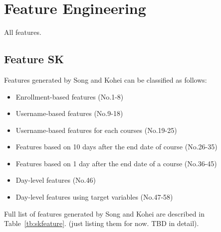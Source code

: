 \section{Feature Engineering}
All features.

\subsection{Feature SK}

Features generated by Song and Kohei can be classified as follows:

\begin{itemize}
  \setlength\itemsep{0em}
  \item Enrollment-based features (No.1-8)
  \item Username-based features (No.9-18)
  \item Username-based features for each courses (No.19-25) 
  \item Features based on 10 days after the end date of course (No.26-35)
  \item Features based on 1 day after the end date of a course (No.36-45)
  \item Day-level features (No.46)
  \item Day-level features using target variables (No.47-58)
\end{itemize}

Full list of features generated by Song and Kohei are described in Table~\ref{tb:skfeature}.
(just listing them for now. TBD in detail).

